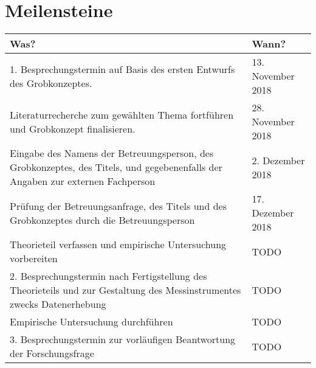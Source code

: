 \documentclass{hwz}
\begin{document}

\newpage
\section{Meilensteine}

 
\begin{center}
    \renewcommand{\arraystretch}{1.25}
    \setlength{\tabcolsep}{15pt}
    \begin{tabular}{ | p{8cm} | l |}
    \hline
    \rowcolor{ccc} Was? & Wann? \\ \hline
    1. Besprechungstermin auf Basis des ersten Entwurfs des Grobkonzeptes. & 13. November 2018 \\ \hline
    
    Literaturrecherche zum gewählten Thema fortführen und Grobkonzept finalisieren. & 28. November 2018 \\ \hline
    
    \rowcolor{orange} Eingabe des Namens der Betreuungsperson, des Grobkonzeptes, des Titels, und gegebenenfalls der Angaben zur externen Fachperson & 2. Dezember 2018 \\ \hline
    
    Prüfung der Betreuungsanfrage, des Titels und des Grobkonzeptes durch die Betreuungsperson & 17. Dezember 2018 \\ \hline
    
    Theorieteil verfassen und empirische Untersuchung vorbereiten & TODO \\ \hline
    
    2. Besprechungstermin nach Fertigstellung des Theorieteils und zur Gestaltung des Messinstrumentes zwecks Datenerhebung & TODO \\ \hline
    
    Empirische Untersuchung durchführen & TODO \\ \hline
    
    3. Besprechungstermin zur vorläufigen Beantwortung der Forschungsfrage & TODO \\ \hline
    

\end{tabular}
\end{center}
\end{document}
